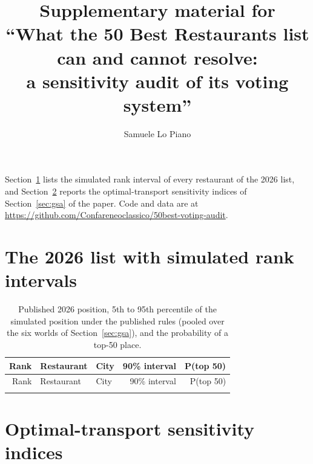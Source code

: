 \documentclass[11pt,a4paper]{article}
\title{Supplementary material for\\``What the 50 Best Restaurants list can and cannot resolve:\\a sensitivity audit of its voting system''}
\author{Samuele Lo Piano}
\date{}
\begin{document}
\maketitle

\noindent Section~\ref{app:intervals} lists the simulated rank interval of every restaurant of the 2026 list, and Section~\ref{app:ot} reports the optimal-transport sensitivity indices of Section~\ref{sec:gsa} of the paper. Code and data are at \url{https://github.com/Confareneoclassico/50best-voting-audit}.

\section{The 2026 list with simulated rank intervals}\label{app:intervals}

{\small
\begin{longtable}{@{}rllrr@{}}
\caption{Published 2026 position, 5th to 95th percentile of the simulated position under the published rules (pooled over the six worlds of Section~\ref{sec:gsa}), and the probability of a top-50 place.}\label{tab:intervals}\\
\toprule
Rank & Restaurant & City & 90\% interval & P(top 50) \\
\midrule
\endfirsthead
\toprule
Rank & Restaurant & City & 90\% interval & P(top 50) \\
\midrule
\endhead
\bottomrule
\endfoot

\end{longtable}
}

\section{Optimal-transport sensitivity indices}\label{app:ot}
\end{document}
